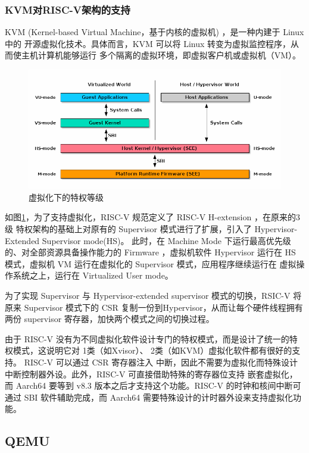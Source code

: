 \documentclass{../runikraft-report}
\begin{document}
\subsubsection{KVM对RISC-V架构的支持}
KVM (Kernel-based Virtual Machine，基于内核的虚拟机)  ，是一种内建于 Linux 中的
开源虚拟化技术。具体而言，KVM 可以将 Linux 转变为虚拟监控程序，从而使主机计算机能够运行
多个隔离的虚拟环境，即虚拟客户机或虚拟机（VM）。
\begin{figure}[!hbt]
	\centering
	\includegraphics[width=0.9\linewidth]{../assets/riscv-sbi-intro2.png}
	\caption{虚拟化下的特权等级}
	\label{fig:w4}
\end{figure}

如图\ref{fig:w4}，为了支持虚拟化，RISC-V 规范定义了 RISC-V H-extension ，在原来的3级
特权架构的基础上对原有的 Supervisor 模式进行了扩展，引入了 Hypervisor-Extended Supervisor mode(HS)。
此时，在 Machine Mode 下运行最高优先级的、对全部资源具备操作能力的 Firmware ，虚拟机软件
Hypervisor 运行在 HS 模式，虚拟机 VM 运行在虚拟化的 Supervisor 模式，应用程序继续运行在
虚拟操作系统之上，运行在 Virtualized User mode。

为了实现 Supervisor 与 Hypervisor-extended supervisor 模式的切换，RSIC-V 将原来
Supervisor 模式下的 CSR 复制一份到Hypervisor，从而让每个硬件线程拥有两份 supervisor
寄存器，加快两个模式之间的切换过程。

由于 RISC-V 没有为不同虚拟化软件设计专门的特权模式，而是设计了统一的特权模式，这说明它对
1类（如Xvisor）、 2类（如KVM）虚拟化软件都有很好的支持。 RISC-V 可以通过 CSR 寄存器注入
中断，因此不需要为虚拟化而特殊设计中断控制器外设。此外，RISC-V 可直接借助特殊的寄存器位支持
嵌套虚拟化，而 Aarch64 要等到 v8.3 版本之后才支持这个功能。RISC-V 的时钟和核间中断可通过
SBI 软件辅助完成，而 Aarch64 需要特殊设计的计时器外设来支持虚拟化功能。\cite{bib:feasibility-d}

\subsection{QEMU}
\end{document}
